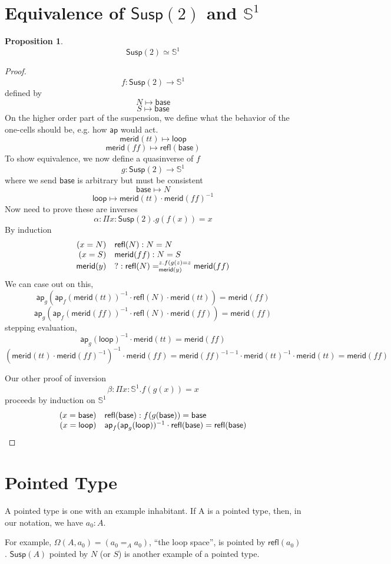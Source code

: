 \documentclass[11pt]{article}
\renewcommand{\SS}{\mathbb{S}}
\renewcommand{\refl}{\mathsf{refl}}
\newcommand {\sbase}{\mathsf{base}}
\newcommand {\sloop}{\mathsf{loop}}
\newcommand*{\ap}{\mathsf{ap}}
\newcommand{\merid}{\mathsf{merid}}
\newcommand{\susp}[1]{\mathsf{Susp}(#1)}
\newtheorem{proposition}{Proposition}
\begin{document}
\section{Equivalence of $\susp{2}$ and $\SS^1$}
\begin{proposition}
$$\susp{2} \simeq \SS^1$$
\end{proposition}
\begin{proof}
$$f : \susp{2} \rightarrow \SS^1$$
defined by 
$$N \mapsto \sbase$$
$$S \mapsto \sbase$$
On the higher order part of the suspension, we define what the behavior of the one-cells should be, e.g. how $\ap$ would act.
$$\merid(tt) \mapsto \sloop$$
$$\merid(ff) \mapsto \refl(\sbase)$$
To show equivalence, we now define a quasinverse of $f$
$$g : \susp{2} \rightarrow \SS^1$$
where we send $\sbase$ is arbitrary but must be consistent
$$\sbase \mapsto N$$
$$\sloop \mapsto \merid(tt) \cdot \merid(ff)^{-1}$$
Now need to prove these are inverses
$$\alpha : \Pi x : \susp{2} . g(f(x)) = x$$
By induction
\[
\begin{array}{r l}
(x = N)& \refl(N) : N = N \\
(x = S)& \merid(ff) : N = S\\
\merid(y) & ? : \refl(N) =_{\merid(y)}^{z.f(g(z) = z} \merid(ff)
\end{array}
\]
We can case out on this,
$$\ap_g (\ap_f (\merid(tt))^{-1} \cdot \refl(N) \cdot \merid(tt)) = \merid(ff)$$
$$\ap_g (\ap_f (\merid(ff))^{-1} \cdot \refl(N) \cdot \merid(ff)) = \merid(ff)$$
stepping evaluation,
$$\ap_g (\sloop)^{-1} \cdot \merid(tt) = \merid(ff)$$
$$(\merid(tt) \cdot \merid(ff)^{-1})^{-1} \cdot \merid(ff) = \merid(ff)^{-1-1} \cdot \merid(tt)^{-1} \cdot \merid(tt) = \merid(ff)$$

Our other proof of inversion
$$\beta : \Pi x : \SS^1 . f(g(x)) = x$$
proceeds by induction on $\SS^1$
\[
\begin{array}{r l}
(x = \sbase) & \refl(\sbase) : f(g(\sbase)) = \sbase\\
(x = \sloop) & \ap_f(\ap_g(\sloop))^{-1} \cdot \refl(\sbase) = \refl(\sbase)
\end{array}
\]
\end{proof}
\section{Pointed Type}
A pointed type is one with an example inhabitant. If A is a pointed type, then, in our notation, we have $a_0 : A$.

For example, $\Omega(A, a_0) = (a_0 =_A a_0)$, ``the loop space'', is pointed by $\refl(a_0)$. $\susp{A}$ pointed by $N$ (or $S$) is another example of a pointed type.
\end{document}
